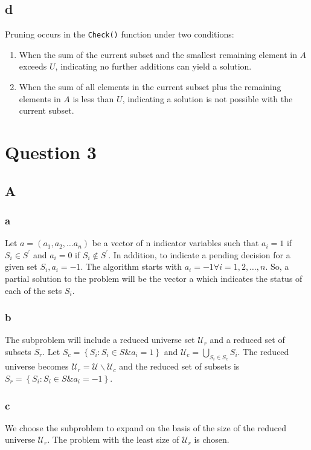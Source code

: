 \documentclass{article}
\begin{document}
\subsection{d}
Pruning occurs in the \texttt{Check()} function under two conditions:
\begin{enumerate}
    \item When the sum of the current subset and the smallest remaining element in $A$ exceeds $U$, indicating no further additions can yield a solution.
    \item When the sum of all elements in the current subset plus the remaining elements in $A$ is less than $U$, indicating a solution is not possible with the current subset.
\end{enumerate}
\section{Question 3}
\subsection{A}
\subsubsection{a}
Let $a=\left(a_1, a_2, \ldots a_n\right)$ be a vector of $\mathrm{n}$ indicator variables such that $a_i=1$ if $S_i \in S^{\prime}$ and $a_i=0$ if $S_i \notin S^{\prime}$. In addition, to indicate a pending decision for a given set $S_i, a_i=-1$. The algorithm starts with $a_i=-1 \forall i=1,2, \ldots, n$. So, a partial solution to the problem will be the vector a which indicates the status of each of the sets $S_i$.
\subsubsection{b}
The subproblem will include a reduced universe set $\mathcal{U}_r$ and a reduced set of subsets $S_r$. Let $S_c=\left\{S_i: S_i \in S \& a_i=1\right\}$ and $\mathcal{U}_c=\bigcup_{S_i \in S_c} S_i$. The reduced universe becomes $\mathcal{U}_r=\mathcal{U} \backslash \mathcal{U}_c$ and the reduced set of subsets is $S_r=\left\{S_i: S_i \in S \& a_i=-1\right\}$.
\subsubsection{c}
We choose the subproblem to expand on the basis of the size of the reduced universe $\mathcal{U}_r$. The problem with the least size of $\mathcal{U}_r$ is chosen.
\end{document}
